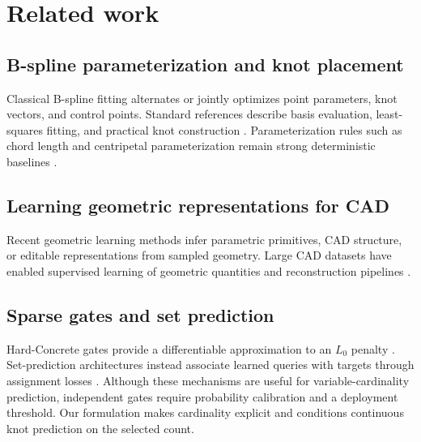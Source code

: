 \section{Related work}
\label{sec:related_work}

\subsection{B-spline parameterization and knot placement}

Classical B-spline fitting alternates or jointly optimizes point parameters,
knot vectors, and control points. Standard references describe basis evaluation,
least-squares fitting, and practical knot construction
\cite{deboor1972,cox1972,piegl1997,dierckx1993}. Parameterization rules such as
chord length and centripetal parameterization remain strong deterministic
baselines \cite{lee1989}. 

\subsection{Learning geometric representations for CAD}

Recent geometric learning methods infer parametric primitives, CAD structure,
or editable representations from sampled geometry. Large CAD datasets have
enabled supervised learning of geometric quantities and reconstruction
pipelines \cite{koch2019abc}. 

\subsection{Sparse gates and set prediction}

Hard-Concrete gates provide a differentiable approximation to an $L_0$
penalty \cite{louizos2018}. Set-prediction architectures instead associate
learned queries with targets through assignment losses \cite{carion2020}.
Although these mechanisms are useful for variable-cardinality prediction,
independent gates require probability calibration and a deployment threshold.
Our formulation makes cardinality explicit and conditions continuous knot
prediction on the selected count.
